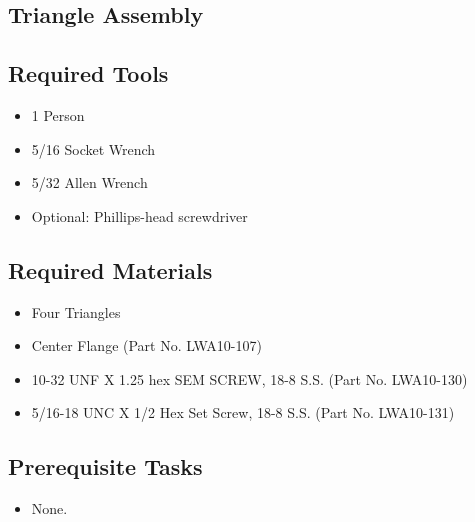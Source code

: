 \documentclass[12pt]{article}
\begin{document}
\begin{enumerate}
\section{Triangle Assembly} \label{TriAssemSec}
	\subsection{Required Tools}
		\begin{itemize}
			\item 1 Person
			\item 5/16 Socket Wrench
			\item 5/32 Allen Wrench
			\item Optional: Phillips-head screwdriver
		\end{itemize}

	\subsection{Required Materials}
		\begin{itemize}
			\item Four Triangles
			\item Center Flange (Part No. LWA10-107)
			\item 10-32 UNF X 1.25 hex SEM SCREW, 18-8 S.S. (Part No. LWA10-130)
			\item 5/16-18 UNC X 1/2 Hex Set Screw, 18-8 S.S. (Part No. LWA10-131)
		\end{itemize}

		\subsection{Prerequisite Tasks}
			\begin{itemize}
				\item None.
			\end{itemize}
			

\end{enumerate}
\end{document}
